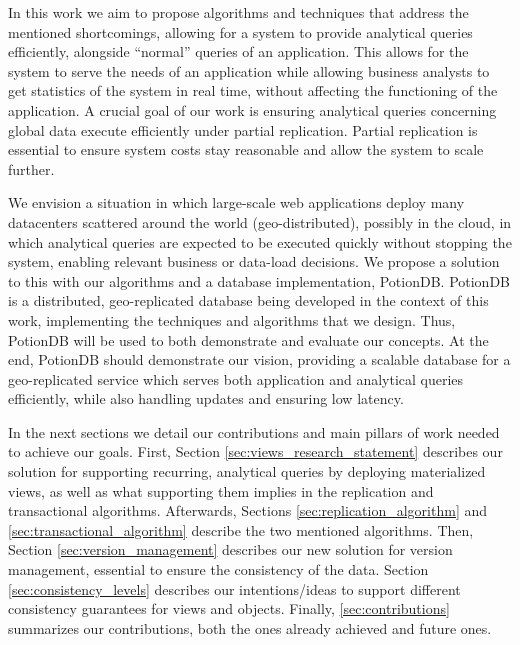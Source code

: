 
In this work we aim to propose algorithms and techniques that address the mentioned shortcomings, allowing for a system to provide analytical queries efficiently, alongside ``normal'' queries of an application.
This allows for the system to serve the needs of an application while allowing business analysts to get statistics of the system in real time, without affecting the functioning of the application.
A crucial goal of our work is ensuring analytical queries concerning global data execute efficiently under partial replication.
Partial replication is essential to ensure system costs stay reasonable and allow the system to scale further.

We envision a situation in which large-scale web applications deploy many datacenters scattered around the world (geo-distributed), possibly in the cloud, in which analytical queries are expected to be executed quickly without stopping the system, enabling relevant business or data-load decisions.
We propose a solution to this with our algorithms and a database implementation, PotionDB.
PotionDB is a distributed, geo-replicated database being developed in the context of this work, implementing the techniques and algorithms that we design.
Thus, PotionDB will be used to both demonstrate and evaluate our concepts.
At the end, PotionDB should demonstrate our vision, providing a scalable database for a geo-replicated service which serves both application and analytical queries efficiently, while also handling updates and ensuring low latency.

In the next sections we detail our contributions and main pillars of work needed to achieve our goals.
First, Section \ref{sec:views_research_statement} describes our solution for supporting recurring, analytical queries by deploying materialized views, as well as what supporting them implies in the replication and transactional algorithms.
Afterwards, Sections \ref{sec:replication_algorithm} and \ref{sec:transactional_algorithm} describe the two mentioned algorithms.
Then, Section \ref{sec:version_management} describes our new solution for version management, essential to ensure the consistency of the data.
Section \ref{sec:consistency_levels} describes our intentions/ideas to support different consistency guarantees for views and objects.
Finally, \ref{sec:contributions} summarizes our contributions, both the ones already achieved and future ones.

